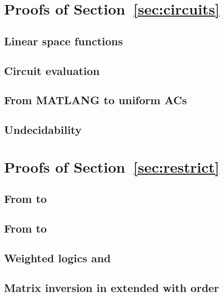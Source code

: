\section{Proofs of Section~\ref{sec:circuits}}

% 

\subsection{Linear space functions}


\subsection{Circuit evaluation}


\subsection{From MATLANG to uniform ACs}


\subsection{Undecidability}



\section{Proofs of Section~\ref{sec:restrict}}

\subsection{From \langsum to \rak}


\subsection{From \rak to \langsum}


%

% 

\subsection{Weighted logics and \langprod}


\subsection{Matrix inversion in \langmprod extended with order}\label{app:asset_order}

